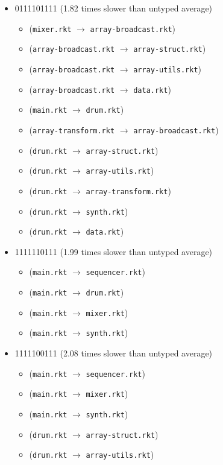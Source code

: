 \documentclass{article}
\newcommand{\mono}[1]{\texttt{#1}}
\begin{document}
\begin{itemize}
\begin{itemize}
  \end{itemize}
\item 0111101111 (1.82 times slower than untyped average)
  \begin{itemize}
  \item (\mono{mixer.rkt} $\rightarrow$ \mono{array-broadcast.rkt})
  \item (\mono{array-broadcast.rkt} $\rightarrow$ \mono{array-struct.rkt})
  \item (\mono{array-broadcast.rkt} $\rightarrow$ \mono{array-utils.rkt})
  \item (\mono{array-broadcast.rkt} $\rightarrow$ \mono{data.rkt})
  \item (\mono{main.rkt} $\rightarrow$ \mono{drum.rkt})
  \item (\mono{array-transform.rkt} $\rightarrow$ \mono{array-broadcast.rkt})
  \item (\mono{drum.rkt} $\rightarrow$ \mono{array-struct.rkt})
  \item (\mono{drum.rkt} $\rightarrow$ \mono{array-utils.rkt})
  \item (\mono{drum.rkt} $\rightarrow$ \mono{array-transform.rkt})
  \item (\mono{drum.rkt} $\rightarrow$ \mono{synth.rkt})
  \item (\mono{drum.rkt} $\rightarrow$ \mono{data.rkt})
  \end{itemize}
\item 1111110111 (1.99 times slower than untyped average)
  \begin{itemize}
  \item (\mono{main.rkt} $\rightarrow$ \mono{sequencer.rkt})
  \item (\mono{main.rkt} $\rightarrow$ \mono{drum.rkt})
  \item (\mono{main.rkt} $\rightarrow$ \mono{mixer.rkt})
  \item (\mono{main.rkt} $\rightarrow$ \mono{synth.rkt})
  \end{itemize}
\item 1111100111 (2.08 times slower than untyped average)
  \begin{itemize}
  \item (\mono{main.rkt} $\rightarrow$ \mono{sequencer.rkt})
  \item (\mono{main.rkt} $\rightarrow$ \mono{mixer.rkt})
  \item (\mono{main.rkt} $\rightarrow$ \mono{synth.rkt})
  \item (\mono{drum.rkt} $\rightarrow$ \mono{array-struct.rkt})
  \item (\mono{drum.rkt} $\rightarrow$ \mono{array-utils.rkt})

\end{itemize}
\end{itemize}
\end{document}
